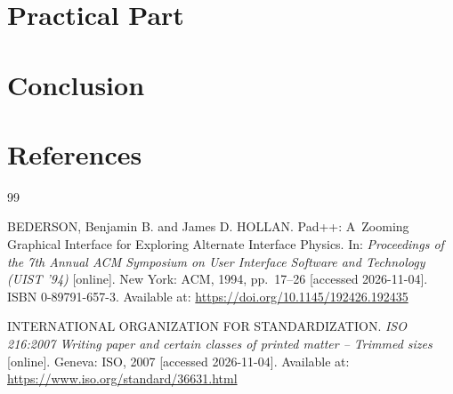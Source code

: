 \documentclass[12pt, a4paper, oneside]{article}
\begin{document}
\section{Practical Part}
\label{sec:prakticka_cast}




\section{Conclusion}
\label{sec:zaver}




\section{References}
\label{sec:zdroje}

\begingroup
\sloppy
\renewcommand{\section}[2]{}%
\begin{thebibliography}{99}

    BEDERSON, Benjamin B. and James D. HOLLAN. Pad++: A~Zooming Graphical Interface for Exploring Alternate Interface Physics. In: \textit{Proceedings of the 7th Annual ACM Symposium on User Interface Software and Technology (UIST '94)} [online]. New York: ACM, 1994, pp.~17--26 [accessed 2026-11-04]. ISBN 0-89791-657-3. Available at: \url{https://doi.org/10.1145/192426.192435}

    INTERNATIONAL ORGANIZATION FOR STANDARDIZATION. \textit{ISO 216:2007 Writing paper and certain classes of printed matter -- Trimmed sizes} [online]. Geneva: ISO, 2007 [accessed 2026-11-04]. Available at: \url{https://www.iso.org/standard/36631.html}

\end{thebibliography}
\endgroup


\clearpage
\section*{Appendices}
\end{document}
